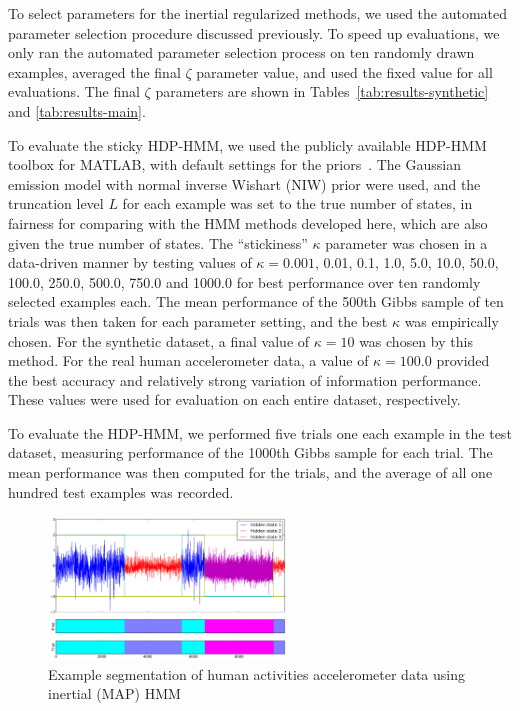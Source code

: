 \documentclass[letterpaper]{article}
\begin{document}
To select parameters for the inertial regularized methods, we used the automated
parameter selection procedure discussed previously. To speed up evaluations, we only 
ran the automated parameter selection process on ten randomly drawn examples, averaged 
the final $\zeta$ parameter value, and used the fixed value for all evaluations. The 
final $\zeta$ parameters are shown in Tables~\ref{tab:results-synthetic} and \ref{tab:results-main}.

To evaluate the sticky HDP-HMM, we used the publicly available HDP-HMM toolbox for MATLAB,
with default settings for the priors~\cite{HDP-HMM-TOOLKIT}. The Gaussian emission model with normal
inverse Wishart (NIW) prior were used, and the truncation level $L$ for each
example was set to the true number of states, in fairness for comparing with the
HMM methods developed here, which are also given the true number of states. The
``stickiness'' $\kappa$ parameter was chosen in a data-driven manner by testing
values of $\kappa=0.001$, 0.01, 0.1, 1.0, 5.0, 10.0, 50.0, 100.0, 250.0, 500.0,
750.0 and 1000.0 for best performance over ten randomly selected examples each.
The mean performance of the 500th Gibbs sample of ten trials was then taken for
each parameter setting, and the best $\kappa$ was empirically chosen. For the
synthetic dataset, a final value of $\kappa=10$ was chosen by this method. For
the real human accelerometer data, a value of $\kappa=100.0$ provided the best
accuracy and relatively strong variation of information performance. These
values were used for evaluation on each entire dataset, respectively.

To evaluate the HDP-HMM, we performed five trials one each example in the test
dataset, measuring performance of the 1000th Gibbs sample for each trial. The
mean performance was then computed for the trials, and the average of all one
hundred test examples was recorded.

\vspace{-0.1cm}
\begin{figure}[htbp]
  \centering
    \includegraphics[width=0.8\linewidth, height=1.5in]{images/MAP_PARAM_FREE_results_hard_activity_long_1,97_3_states.pdf}    
    \caption{\small{Example segmentation of human activities accelerometer data
    using inertial (MAP) HMM}}
    \label{fig:real-results-MAP}
    \vspace{-0.5cm}
\end{figure}
\end{document}
